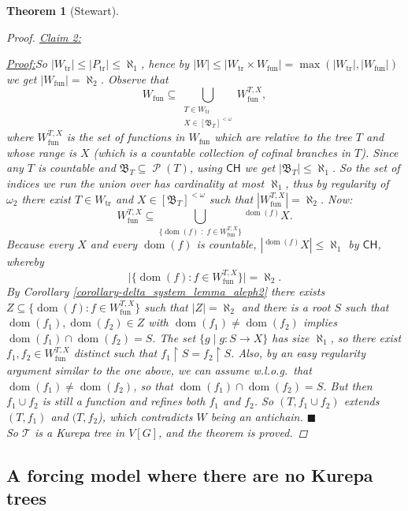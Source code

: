\documentclass[11pt,a4paper]{report}
\newtheorem{theorem}{Theorem}[chapter] %
\theoremstyle{definition}
\theoremstyle{num.custom-title}
\theoremstyle{custom-title}
\newenvironment{claim}[1]{\par\noindent\underline{Claim#1:}\space}{} %
\newenvironment{claimproof}[1]{\par\noindent\underline{Proof:}\space#1}{\leavevmode\unskip\penalty9999 \hbox{}\nobreak\hfill\quad\hbox{$\blacksquare$}} %
\DeclareMathOperator{\dom}{dom}
\DeclareMathOperator{\PP}{\mathcal{P}}
\DeclareMathOperator{\sse}{\subseteq}
\DeclareMathOperator{\restr}{\upharpoonright}
\newcommand{\CH}{\ensuremath{\mathsf{CH}}\xspace}
\newcommand{\T}{\mathcal{T}}
\begin{document}
\begin{theorem}[Stewart]
\begin{proof}
\begin{claim}{ 2}
\begin{claimproof}
So $|W_{\text{tr}}| \leq |P_{\text{tr}}| \leq \aleph_1$, hence by $|W| \leq |W_{\text{tr}} \times W_{\text{fun}}| = \max(|W_{\text{tr}}|,|W_{\text{fun}}|)$ we get $|W_{\text{fun}}| = \aleph_2$. Observe that
\[
W_{\text{fun}} \sse \bigcup_{\substack{T \in W_{\text{tr}} \\ X \in [\mathfrak{B}_T]^{< \omega} }} W_{\text{fun}}^{T,X},
\]
where $W_{\text{fun}}^{T,X}$ is the set of functions in $W_{\text{fun}}$ which are relative to the tree $T$ and whose range is $X$ (which is a countable collection of cofinal branches in $T$). Since any $T$ is countable and $\mathfrak{B}_T \sse \PP(T)$, using \CH we get $|\mathfrak{B}_T| \leq \aleph_1$. So the set of indices we run the union over has cardinality at most $\aleph_1$, thus by regularity of $\omega_2$ there exist $T \in W_{\text{tr}}$ and $X \in [\mathfrak{B}_T]^{< \omega}$ such that $|W_{\text{fun}}^{T,X}| = \aleph_2$. Now:
\[
W_{\text{fun}}^{T,X} \sse \bigcup_{ \big\{ {\dom(f)} \; : \; f \in W_{\text{fun}}^{T,X} \big\} } {^{\dom(f)}} X.
\]
Because every $X$ and every $\dom(f)$ is countable, $|{^{\dom(f)}} X| \leq \aleph_1$ by \CH, whereby
\[
\big| \big\{ {\dom(f)} : f \in W_{\text{fun}}^{T,X} \big\} \big| = \aleph_2.
\]
By Corollary \ref{corollary-delta_system_lemma_aleph2} there exists $Z \sse \big\{ {\dom(f)} : f \in W_{\text{fun}}^{T,X} \big\}$ such that $|Z| = \aleph_2$ and there is a root $S$ such that $\dom(f_1), \dom(f_2) \in Z$ with $\dom(f_1) \neq \dom(f_2)$ implies $\dom(f_1) \cap \dom(f_2) = S$. The set $\{g \mid g : S \to X\}$ has size $\aleph_1$, so there exist $f_1,f_2 \in W_{\text{fun}}^{T,X}$ distinct such that $f_1 \restr S = f_2 \restr S$. Also, by an easy regularity argument similar to the one above, we can assume w.l.o.g.\ that $\dom(f_1) \neq \dom(f_2)$, so that $\dom(f_1) \cap \dom(f_2) = S$. But then $f_1 \cup f_2$ is still a function and refines both $f_1$ and $f_2$. So $(T, f_1 \cup f_2)$ extends $(T,f_1)$ and $(T,f_2$), which contradicts $W$ being an antichain.
\end{claimproof}
\end{claim}
\\[6pt]
\indent So $\T$ is a Kurepa tree in $V[G]$, and the theorem is proved.
\end{proof}
\end{theorem}


\subsection{A forcing model where there are no Kurepa trees}
\end{document}
